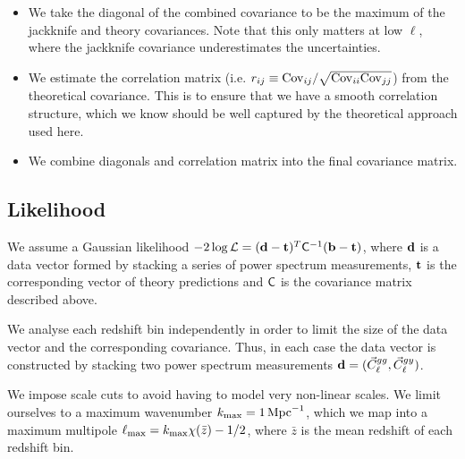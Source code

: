 \documentclass{article}
\begin{document}
\begin{enumerate}
            \begin{itemize}
              \item We take the diagonal of the combined covariance to be the maximum of the jackknife and theory covariances. Note that this only matters at low $\ell$, where the jackknife covariance underestimates the uncertainties.
              \item We estimate the correlation matrix (i.e. $r_{ij}\equiv{\rm Cov}_{ij}/\sqrt{{\rm Cov}_{ii}{\rm Cov}_{jj}}$) from the theoretical covariance. This is to ensure that we have a smooth correlation structure, which we know should be well captured by the theoretical approach used here.
              \item We combine diagonals and correlation matrix into the final covariance matrix.
            \end{itemize}
    \end{enumerate}
  
  \subsection{Likelihood}
    We assume a Gaussian likelihood $-2\log{\cal L}=({\bf d}-{\bf t})^T{\sf C}^{-1}({\bf b}-{\bf t})$, where ${\bf d}$ is a data vector formed by stacking a series of power spectrum measurements, ${\bf t}$ is the corresponding vector of theory predictions and ${\sf C}$ is the covariance matrix described above.
    
    We analyse each redshift bin independently in order to limit the size of the data vector and the corresponding covariance. Thus, in each case the data vector is constructed by stacking two power spectrum measurements ${\bf d}=(\vec{C}^{gg}_\ell,\vec{C}^{gy}_\ell)$.
    
    We impose scale cuts to avoid having to model very non-linear scales. We limit ourselves to a maximum wavenumber $k_{\rm max}=1\,{\rm Mpc}^{-1}$, which we map into a maximum multipole $\ell_{\rm max}=k_{\rm max}\chi(\bar{z})-1/2$, where $\bar{z}$ is the mean redshift of each redshift bin.
\end{document}
